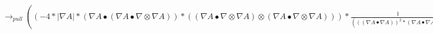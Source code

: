 \documentclass{article}
\begin{document}
\newline $\rightarrow_{pull}((-4*| \nabla A|*( \nabla A \bullet ( \nabla A \bullet  \nabla  \otimes  \nabla A))*(( \nabla A \bullet  \nabla  \otimes  \nabla A) \otimes ( \nabla A \bullet  \nabla  \otimes  \nabla A)))* \frac{1}{((( \nabla A \bullet  \nabla A))^2*( \nabla A \bullet  \nabla A))}+(-2*( \nabla A \bullet ( \nabla A \bullet  \nabla  \otimes  \nabla A))*(( \nabla A \bullet  \nabla  \otimes  \nabla A) \otimes ( \nabla A \bullet  \nabla  \otimes  \nabla A)))* \frac{1}{(| \nabla A|*( \nabla A \bullet  \nabla A)*( \nabla A \bullet  \nabla A))}+((2*| \nabla A|*( \nabla A \bullet ( \nabla A \bullet  \nabla  \otimes  \nabla A))*( \nabla A \bullet  \nabla  \otimes  \nabla  \otimes  \nabla A))+(2*| \nabla A|*( \nabla A \bullet ( \nabla A \bullet  \nabla  \otimes  \nabla A))*(( \nabla  \otimes  \nabla A)^T \bullet  \nabla  \otimes  \nabla A)))* \frac{1}{((( \nabla A \bullet  \nabla A))^2)}+((2*(( \nabla A \bullet (( \nabla  \otimes  \nabla A)^T \bullet  \nabla  \otimes  \nabla A)) \otimes ( \nabla A \bullet  \nabla  \otimes  \nabla A)))+((2*((( \nabla  \otimes  \nabla A)^T \bullet ( \nabla A \bullet  \nabla  \otimes  \nabla A))*( \nabla A \bullet  \nabla  \otimes  \nabla A))))^T+(2*((( \nabla  \otimes  \nabla A)^T \bullet ( \nabla A \bullet  \nabla  \otimes  \nabla A)) \otimes ( \nabla A \bullet  \nabla  \otimes  \nabla A)))+((2*(( \nabla A \bullet ( \nabla A \bullet  \nabla  \otimes  \nabla  \otimes  \nabla A))*( \nabla A \bullet  \nabla  \otimes  \nabla A))))^T+((2*(( \nabla A \bullet (( \nabla  \otimes  \nabla A)^T \bullet  \nabla  \otimes  \nabla A))*( \nabla A \bullet  \nabla  \otimes  \nabla A))))^T+(2*(( \nabla A \bullet ( \nabla A \bullet  \nabla  \otimes  \nabla  \otimes  \nabla A)) \otimes ( \nabla A \bullet  \nabla  \otimes  \nabla A))))* \frac{1}{(| \nabla A|*( \nabla A \bullet  \nabla A))}+(((((((((-2*(Trav( \nabla  \otimes  \nabla  \otimes  \nabla A)<2,0,1> \bullet ( \nabla A \bullet  \nabla  \otimes  \nabla A)))+(-2*(( \nabla  \otimes  \nabla A)^T \bullet ( \nabla A \bullet  \nabla  \otimes  \nabla  \otimes  \nabla A))))+(-2*(( \nabla  \otimes  \nabla A)^T \bullet (( \nabla  \otimes  \nabla A)^T \bullet  \nabla  \otimes  \nabla A))))+(-2*( \nabla A \bullet ( \nabla A \bullet  \nabla  \otimes  \nabla  \otimes  \nabla  \otimes  \nabla A))))+(-2*( \nabla A \bullet (Trav( \nabla  \otimes  \nabla  \otimes  \nabla A)<2,1,0> \bullet  \nabla  \otimes  \nabla A))))+(-2*( \nabla A \bullet (( \nabla  \otimes  \nabla A)^T \bullet  \nabla  \otimes  \nabla  \otimes  \nabla A))))+(-2*( \nabla A \bullet Trav((( \nabla  \otimes  \nabla A)^T \bullet  \nabla  \otimes  \nabla  \otimes  \nabla A))<1,0,2>)))+((-2*(( \nabla  \otimes  \nabla A)^T \bullet ( \nabla A \bullet  \nabla  \otimes  \nabla  \otimes  \nabla A))))^T)+((-2*(( \nabla  \otimes  \nabla A)^T \bullet (( \nabla  \otimes  \nabla A)^T \bullet  \nabla  \otimes  \nabla A))))^T)* \frac{1}{| \nabla A|})$
\end{document}
